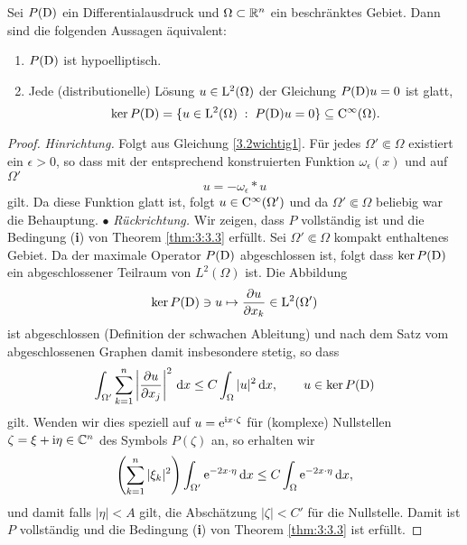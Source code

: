 %
%
%
%

\begin{thm}
Sei $P(\mathrm D)$ ein Differentialausdruck und $\Omega\subset\mathbb R^n$ ein beschränktes Gebiet. Dann sind die folgenden Aussagen äquivalent:
\begin{enumerate}
\item $P(\mathrm D)$ ist hypoelliptisch.
\item Jede (distributionelle) Lösung $u\in\mathrm L^2(\Omega)$ der Gleichung $P(\mathrm D)u=0$ ist glatt,
\begin{equation}
    \ker P(\mathrm D) = \{ u\in\mathrm L^2(\Omega) \;:\; P(\mathrm D)u=0\} \subseteq\mathrm C^\infty(\Omega).
\end{equation}
\end{enumerate}
\end{thm}
\begin{proof}
\emph{Hinrichtung.} Folgt aus Gleichung \eqref{3.2wichtig1}. Für jedes $\Omega'\Subset\Omega$ existiert ein $\epsilon>0$, so dass mit der entsprechend konstruierten Funktion $\omega_\epsilon(x)$ und auf $\Omega'$
\begin{equation}
 u = - \omega_\epsilon*u 
\end{equation}
gilt. Da diese Funktion glatt ist, folgt $u\in\mathrm C^\infty(\Omega')$ und da $\Omega'\Subset\Omega$ beliebig war die Behauptung. $\bullet$ \qquad
\emph{Rückrichtung.} Wir zeigen, dass $P$ vollständig ist und die Bedingung ({\bf i}) von Theorem \ref{thm:3:3.3} erfüllt.   Sei $\Omega'\Subset \Omega$ kompakt enthaltenes Gebiet. Da der maximale Operator $P(\mathrm D)$  abgeschlossen ist, folgt dass $\ker P(\mathrm D)$ ein abgeschlossener Teilraum von $L^2(\Omega)$ ist. Die Abbildung
\begin{equation}
\ker P(\mathrm D)\ni u \mapsto \frac{\partial u}{\partial x_k} \in \mathrm L^2(\Omega')
\end{equation}  
ist abgeschlossen (Definition der schwachen Ableitung) und nach dem Satz vom abgeschlossenen Graphen damit insbesondere stetig, so dass
\begin{equation}
\int_{\Omega'} \sum_{k=1}^n \left | \frac{\partial u}{\partial x_j}\right |^2\,\mathrm d x \le C \int_\Omega |u|^2\,\mathrm d x, \qquad u\in \ker P(\mathrm D)
\end{equation}
gilt. Wenden wir dies speziell auf $u=\mathrm e^{\mathrm i x\cdot \zeta}$ für (komplexe) Nullstellen $\zeta=\xi+\mathrm i\eta\in\mathbb C^n$ des Symbols $P(\zeta)$ an,  so erhalten wir
\begin{equation}
\left (\sum_{k=1}^n |\xi_k|^2 \right ) \int_{\Omega'} \mathrm e^{-2x\cdot \eta}\,\mathrm d x \le C\int_\Omega \mathrm e^{-2 x\cdot \eta}\,\mathrm d x,
\end{equation}
und damit falls  $|\eta|<A$ gilt, die Abschätzung $|\zeta|<C'$ für die Nullstelle. Damit ist $P$ vollständig und die Bedingung ({\bf i}) von Theorem \ref{thm:3:3.3} ist erfüllt. 
\end{proof}